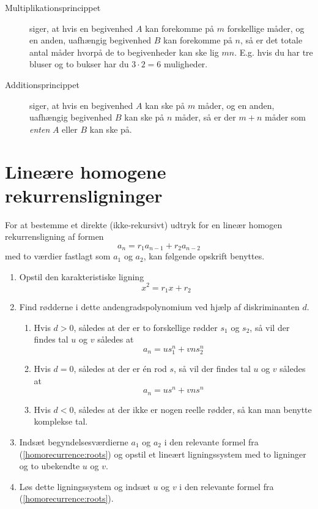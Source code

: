 \documentclass[a4paper]{article}
\begin{document}
\begin{description}

\item[Multiplikationsprincippet] siger, at hvis en begivenhed $A$ kan forekomme på $m$ forskellige
måder, og en anden, uafhængig begivenhed $B$ kan forekomme på $n$, så er det totale antal måder
hvorpå de to begivenheder kan ske lig $mn$. E.g. hvis du har tre bluser og to bukser har du
$3 \cdot 2 = 6$ muligheder.

\item[Additionsprincippet] siger, at hvis en begivenhed $A$ kan ske på $m$ måder, og en anden,
uafhængig begivenhed $B$ kan ske på $n$ måder, så er der $m + n$ måder som {\it enten} $A$ eller $B$
kan ske på.

\end{description}

\section{Lineære homogene rekurrensligninger}

For at bestemme et direkte (ikke-rekursivt) udtryk for en lineær homogen rekurrensligning
af formen $$a_n = r_1a_{n - 1} + r_2a_{n - 2}$$ med to værdier fastlagt som $a_1$ og $a_2$,
kan følgende opskrift benyttes.

\begin{enumerate}

\item Opstil den karakteristiske ligning $$x^2 = r_1x + r_2$$

\item Find rødderne i dette andengradspolynomium ved hjælp af diskriminanten $d$.
\label{homorecurrence:roots}

\begin{enumerate}
\item Hvis $d > 0$, således at der er to forskellige rødder $s_1$ og $s_2$, så vil der
findes tal $u$ og $v$ således at $$a_n = us_1^n + vns_2^n$$

\item Hvis $d = 0$, således at der er én rod $s$, så vil der findes tal $u$ og $v$ således
at $$a_n = us^n + vns^n$$

\item Hvis $d < 0$, således at der ikke er nogen reelle rødder, så kan man benytte komplekse
tal.
\end{enumerate}

\item Indsæt begyndelsesværdierne $a_1$ og $a_2$ i den relevante formel fra (\ref{homorecurrence:roots})
og opstil et lineært ligningssystem med to ligninger og to ubekendte $u$ og $v$.

\item Løs dette ligningssystem og indsæt $u$ og $v$ i den relevante formel fra
(\ref{homorecurrence:roots}).

\end{enumerate}
\end{document}
